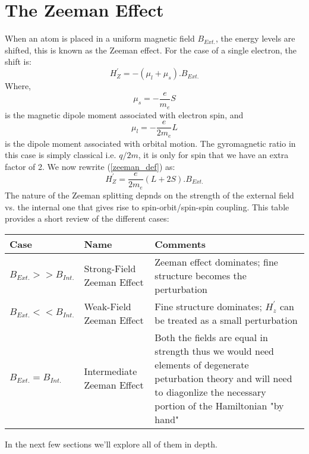 \section{The Zeeman Effect}
When an atom is placed in a uniform magnetic field $B_{Ext.}$, the energy levels are shifted, this is known as the Zeeman effect. For the case of a single electron, the shift is:
\begin{equation}\label{zeeman_def}
H^{'}_{Z} = -(\mu_{l} + \mu_{s}).B_{Ext.}
\end{equation}
Where,
\begin{equation}
\mu_{s} = -\frac{e}{m_{e}}S
\end{equation}
is the magnetic dipole moment associated with electron spin, and
\begin{equation}
\mu_{l} = -\frac{e}{2m_{e}}L
\end{equation}
is the dipole moment associated with orbital motion. The gyromagnetic ratio in this case is simply classical i.e. $q/2m$, it is only for spin that we have an extra factor of 2. We now rewrite (\ref{zeeman_def}) as:
\begin{equation}
H^{'}_{Z} = \frac{e}{2m_{e}}(L + 2S).B_{Ext.}
\end{equation}
The nature of the Zeeman splitting depnds on the strength of the external field vs. the internal one that gives rise to spin-orbit/spin-spin coupling. This table provides a short review of the different cases:
\begin{center}
\begin{tabularx}{0.9\textwidth} { 
		| >{\centering\arraybackslash}X 
		| >{\centering\arraybackslash}X 
		| >{\centering\arraybackslash}X | }
	\hline
	\textbf{Case} & \textbf{Name} & \textbf{Comments} \\
	\hline
	$B_{Ext.} >> B_{Int.}$  & Strong-Field Zeeman Effect  & Zeeman effect dominates; fine structure becomes the perturbation  \\
	\hline
	$B_{Ext.} << B_{Int.}$  & Weak-Field Zeeman Effect  & Fine structure dominates; $H^{'}_{z}$ can be treated as a small perturbation   \\
	\hline
	$B_{Ext.} = B_{Int.}$  & Intermediate Zeeman Effect  & Both the fields are equal in strength thus we would need elements of degenerate peturbation theory and will need to diagonlize the necessary portion of the Hamiltonian "by hand" \\
	\hline
\end{tabularx}
\end{center}
In the next few sections we'll explore all of them in depth.

